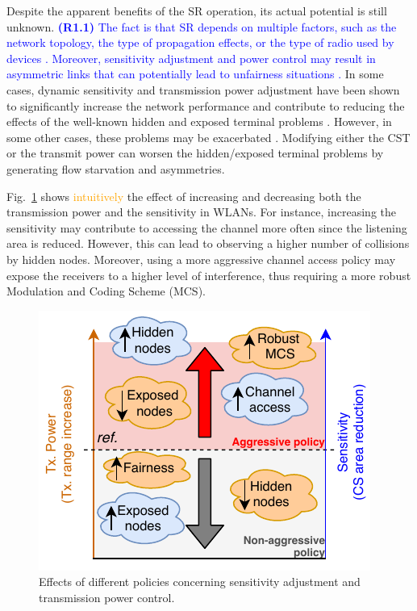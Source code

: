 \documentclass{ieeeaccess}
\begin{document}
Despite the apparent benefits of the SR operation, its actual potential is still unknown. \textcolor{blue}{\textbf{(R1.1)} The fact is that SR depends on multiple factors, such as the network topology, the type of propagation effects, or the type of radio used by devices \cite{guo2003spatial, zhu2004adapting}. Moreover, sensitivity adjustment and power control may result in asymmetric links that can potentially lead to unfairness situations \cite{mhatre2007interference}.} In some cases, dynamic sensitivity and transmission power adjustment have been shown to significantly increase the network performance and contribute to reducing the effects of the well-known hidden and exposed terminal problems \cite{zhou2005balancing}. However, in some other cases, these problems may be exacerbated \cite{wilhelmi2019potential}. Modifying either the CST or the transmit power can worsen the hidden/exposed terminal problems by generating flow starvation and asymmetries.

Fig.~\ref{fig:policies_sr} shows \textcolor{orange}{intuitively} the effect of increasing and decreasing both the transmission power and the sensitivity in WLANs. For instance, increasing the sensitivity may contribute to accessing the channel more often since the listening area is reduced. However, this can lead to observing a higher number of collisions by hidden nodes. Moreover, using a more aggressive channel access policy may expose the receivers to a higher level of interference, thus requiring a more robust Modulation and Coding Scheme (MCS).
\begin{figure}[ht!]
	\centering
	\includegraphics[width=0.8\columnwidth]{policies_sr}
	\caption{Effects of different policies concerning sensitivity adjustment and transmission power control.}
	\label{fig:policies_sr}
\end{figure}
\end{document}
